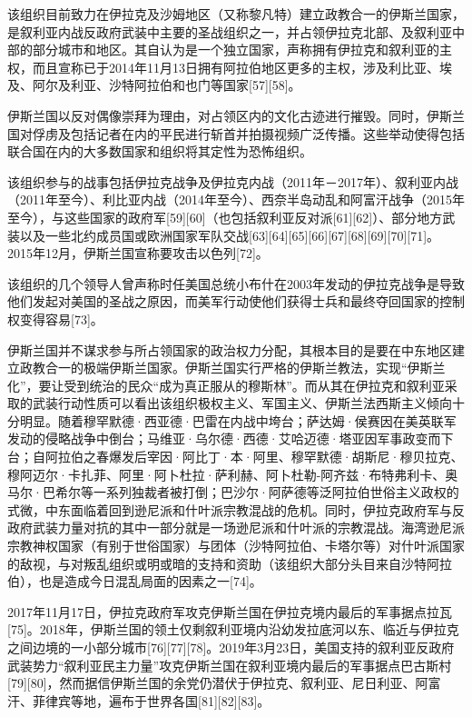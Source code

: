 \documentclass[10pt, UTF8]{ctexbook} %
\begin{document}
该组织目前致力在伊拉克及沙姆地区（又称黎凡特）建立政教合一的伊斯兰国家，是叙利亚内战反政府武装中主要的圣战组织之一，并占领伊拉克北部、及叙利亚中部的部分城市和地区。其自认为是一个独立国家，声称拥有伊拉克和叙利亚的主权，而且宣称已于2014年11月13日拥有阿拉伯地区更多的主权，涉及利比亚、埃及、阿尔及利亚、沙特阿拉伯和也门等国家[57][58]。

伊斯兰国以反对偶像崇拜为理由，对占领区内的文化古迹进行摧毁。同时，伊斯兰国对俘虏及包括记者在内的平民进行斩首并拍摄视频广泛传播。这些举动使得包括联合国在内的大多数国家和组织将其定性为恐怖组织。

该组织参与的战事包括伊拉克战争及伊拉克内战（2011年－2017年）、叙利亚内战（2011年至今）、利比亚内战（2014年至今）、西奈半岛动乱和阿富汗战争（2015年至今），与这些国家的政府军[59][60]（也包括叙利亚反对派[61][62]）、部分地方武装以及一些北约成员国或欧洲国家军队交战[63][64][65][66][67][68][69][70][71]。2015年12月，伊斯兰国宣称要攻击以色列[72]。

该组织的几个领导人曾声称时任美国总统小布什在2003年发动的伊拉克战争是导致他们发起对美国的圣战之原因，而美军行动使他们获得士兵和最终夺回国家的控制权变得容易[73]。

伊斯兰国并不谋求参与所占领国家的政治权力分配，其根本目的是要在中东地区建立政教合一的极端伊斯兰国家。伊斯兰国实行严格的伊斯兰教法，实现“伊斯兰化”，要让受到统治的民众“成为真正服从的穆斯林”。而从其在伊拉克和叙利亚采取的武装行动性质可以看出该组织极权主义、军国主义、伊斯兰法西斯主义倾向十分明显。随着穆罕默德·西亚德·巴雷在内战中垮台；萨达姆·侯赛因在美英联军发动的侵略战争中倒台；马维亚·乌尔德·西德·艾哈迈德·塔亚因军事政变而下台；自阿拉伯之春爆发后宰因·阿比丁·本·阿里、穆罕默德·胡斯尼·穆贝拉克、穆阿迈尔·卡扎菲、阿里·阿卜杜拉·萨利赫、阿卜杜勒-阿齐兹·布特弗利卡、奥马尔·巴希尔等一系列独裁者被打倒；巴沙尔·阿萨德等泛阿拉伯世俗主义政权的式微，中东面临着回到逊尼派和什叶派宗教混战的危机。同时，伊拉克政府军与反政府武装力量对抗的其中一部分就是一场逊尼派和什叶派的宗教混战。海湾逊尼派宗教神权国家（有别于世俗国家）与团体（沙特阿拉伯、卡塔尔等）对什叶派国家的敌视，与对叛乱组织或明或暗的支持和资助（该组织大部分头目来自沙特阿拉伯），也是造成今日混乱局面的因素之一[74]。

2017年11月17日，伊拉克政府军攻克伊斯兰国在伊拉克境内最后的军事据点拉瓦[75]。2018年，伊斯兰国的领土仅剩叙利亚境内沿幼发拉底河以东、临近与伊拉克之间边境的一小部分城市[76][77][78]。2019年3月23日，美国支持的叙利亚反政府武装势力“叙利亚民主力量”攻克伊斯兰国在叙利亚境内最后的军事据点巴古斯村[79][80]，然而据信伊斯兰国的余党仍潜伏于伊拉克、叙利亚、尼日利亚、阿富汗、菲律宾等地，遍布于世界各国[81][82][83]。
\end{document}

